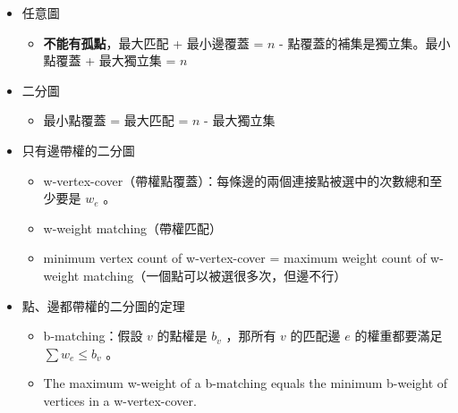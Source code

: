 \begin{itemize}
    \item 任意圖
        \begin{itemize}
            \item \textbf{不能有孤點}，最大匹配 + 最小邊覆蓋 = $n$
            - 點覆蓋的補集是獨立集。最小點覆蓋 + 最大獨立集 = $n$
        \end{itemize}
    \item 二分圖
        \begin{itemize}
            \item 最小點覆蓋 = 最大匹配 = $n$ - 最大獨立集
        \end{itemize}
    \item 只有邊帶權的二分圖
        \begin{itemize}
            \item w-vertex-cover（帶權點覆蓋）：每條邊的兩個連接點被選中的次數總和至少要是 $w_e$ 。
            \item w-weight matching（帶權匹配） 
            \item minimum vertex count of w-vertex-cover = maximum weight count of w-weight matching（一個點可以被選很多次，但邊不行）
        \end{itemize}
    \item 點、邊都帶權的二分圖的定理
        \begin{itemize}
            \item b-matching：假設 $v$ 的點權是 $b_v$ ，那所有 $v$ 的匹配邊 $e$ 的權重都要滿足 $\sum{w_e}\leq b_v$ 。
            \item The maximum w-weight of a b-matching equals the minimum b-weight of vertices in a w-vertex-cover.
        \end{itemize}
\end{itemize}
